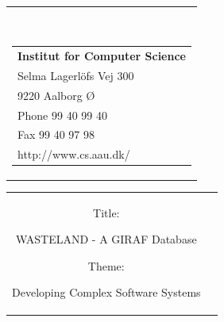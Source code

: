 

{}
\thispagestyle{empty}
\begin{nopagebreak}
{\samepage 
\begin{tabular}{r}
\parbox{\textwidth}{  \\
\hfill \parbox{8cm}{\begin{tabular}{l} %
{\small \textbf{Institut for Computer Science}}\\
{\small Selma Lagerlöfs Vej 300} \\
{\small 9220 Aalborg Ø} \\
{\small Phone 99 40 99 40} \\
{\small Fax 99 40 97 98} \\
{\small http://www.cs.aau.dk/}
\end{tabular}}}

\end{tabular}

\begin{tabular}{cc}
\parbox{7cm}{
\begin{description}

\item { Title:} 

WASTELAND - A GIRAF Database \\
  
\item { Theme:} 

Developing Complex Software Systems

\end{description}

\parbox{8cm}{

}}
\end{tabular}}
\end{nopagebreak}
